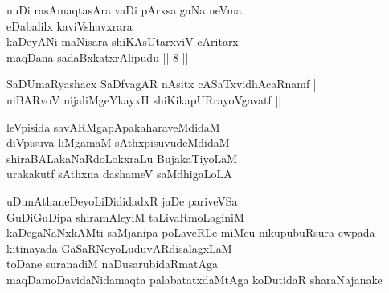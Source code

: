 \begin{entry}
\end{entry}

\begin{entry}
\begin{shl}
nuDi rasAmaqtasAra vaDi pArxsa gaNa neVma\\
eDabalilx kaviVshavxrara\\
kaDeyANi maNisara shiKAsUtarxviV cAritarx\\
maqDana sadaBxkatxrAlipudu || 8 ||
\end{shl}
\end{entry}

\begin{entry}
\begin{shl}
SaDUmaRyashacx SaDfvagAR nAsitx cASaTxvidhAcaRnamf |\\
niBARvoV nijaliMgeYkayxH shiKikapURrayoVgavatf ||
\end{shl}
\end{entry}

\begin{entry}
\begin{shl}
leVpisida savARMgapApakaharaveMdidaM\\
diVpisuva liMgamaM sAthxpisuvudeMdidaM\\
shiraBALakaNaRdoLokxraLu BujakaTiyoLaM\\
urakakutf sAthxna dashameV saMdhigaLoLA
\end{shl}
\end{entry}

\begin{entry}
\begin{shl}
uDunAthaneDeyoLiDididadxR jaDe pariveVSa\\
GuDiGuDipa shiramAleyiM taLivaRmoLaginiM\\
kaDegaNaNxkAMti saMjanipa poLaveRLe miMcu nikupubuRsura cwpada \\
kitinayada GaSaRNeyoLuduvARdisalagxLaM\\
toDane suranadiM naDusarubidaRmatAga\\
maqDamoDavidaNidamaqta palabatatxdaMtAga koDutidaR sharaNajanake
\end{shl}
\end{entry}

